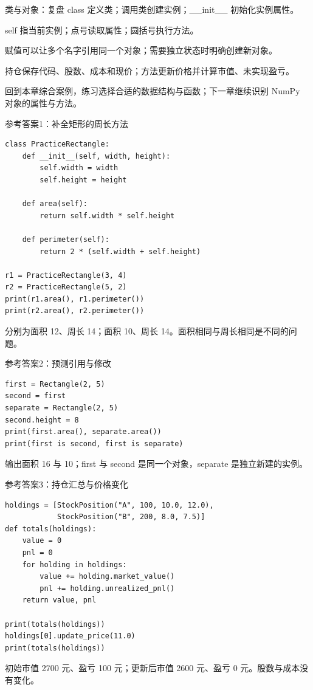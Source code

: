 \documentclass[9pt]{ctexbeamer}
\begin{document}
\begin{frame}{类与对象：复盘}
class 定义类；调用类创建实例；\_\_init\_\_ 初始化实例属性。
\par
self 指当前实例；点号读取属性；圆括号执行方法。
\par
赋值可以让多个名字引用同一个对象；需要独立状态时明确创建新对象。
\par
持仓保存代码、股数、成本和现价；方法更新价格并计算市值、未实现盈亏。
\par
回到本章综合案例，练习选择合适的数据结构与函数；下一章继续识别 NumPy 对象的属性与方法。
\end{frame}

\begin{frame}[fragile]{参考答案1：补全矩形的周长方法}
\begin{lstlisting}
class PracticeRectangle:
    def __init__(self, width, height):
        self.width = width
        self.height = height

    def area(self):
        return self.width * self.height

    def perimeter(self):
        return 2 * (self.width + self.height)

r1 = PracticeRectangle(3, 4)
r2 = PracticeRectangle(5, 2)
print(r1.area(), r1.perimeter())
print(r2.area(), r2.perimeter())
\end{lstlisting}
\small 分别为面积 12、周长 14；面积 10、周长 14。面积相同与周长相同是不同的问题。
\end{frame}

\begin{frame}[fragile]{参考答案2：预测引用与修改}
\begin{lstlisting}
first = Rectangle(2, 5)
second = first
separate = Rectangle(2, 5)
second.height = 8
print(first.area(), separate.area())
print(first is second, first is separate)
\end{lstlisting}
\small 输出面积 16 与 10；first 与 second 是同一个对象，separate 是独立新建的实例。
\end{frame}

\begin{frame}[fragile]{参考答案3：持仓汇总与价格变化}
\begin{lstlisting}
holdings = [StockPosition("A", 100, 10.0, 12.0),
            StockPosition("B", 200, 8.0, 7.5)]
def totals(holdings):
    value = 0
    pnl = 0
    for holding in holdings:
        value += holding.market_value()
        pnl += holding.unrealized_pnl()
    return value, pnl

print(totals(holdings))
holdings[0].update_price(11.0)
print(totals(holdings))
\end{lstlisting}
\small 初始市值 2700 元、盈亏 100 元；更新后市值 2600 元、盈亏 0 元。股数与成本没有变化。
\end{frame}
\end{document}
